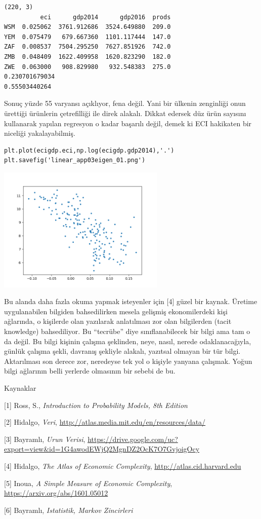 \documentclass[12pt,fleqn]{article}\usepackage{../../common}
\begin{document}
\begin{verbatim}
(220, 3)
          eci      gdp2014      gdp2016  prods
WSM  0.025062  3761.912686  3524.649880  209.0
YEM  0.075479   679.667360  1101.117444  147.0
ZAF  0.008537  7504.295250  7627.851926  742.0
ZMB  0.048409  1622.409958  1620.823290  182.0
ZWE  0.063000   908.829980   932.548383  275.0
0.230701679034
0.55503440264
\end{verbatim}

Sonuç yüzde 55 varyansı açıklıyor, fena değil. Yani bir ülkenin zenginliği
onun ürettiği ürünlerin çetrefilliği ile direk alakalı. Dikkat edersek düz
ürün sayısını kullanarak yapılan regresyon o kadar başarılı değil, demek ki
ECI hakikaten bir niceliği yakalayabilmiş.

\begin{verbatim}
plt.plot(ecigdp.eci,np.log(ecigdp.gdp2014),'.')
plt.savefig('linear_app03eigen_01.png')
\end{verbatim}

\includegraphics[height=6cm]{linear_app03eigen_01.png}

Bu alanda daha fazla okuma yapmak isteyenler için [4] güzel bir
kaynak. Üretime uygulanabilen bilgiden bahsedilirken mesela gelişmiş
ekonomilerdeki kişi ağlarında, o kişilerde olan yazılarak anlatılması zor
olan bilgilerden (tacit knowledge) bahsediliyor. Bu ``tecrübe'' diye
sınıflanabilecek bir bilgi ama tam o da değil. Bu bilgi kişinin çalışma
şeklinden, neye, nasıl, nerede odaklanacağıyla, günlük çalışma şekli,
davranış şekliyle alakalı, yazıtsal olmayan bir tür bilgi. Aktarılması son
derece zor, neredeyse tek yol o kişiyle yanyana çalışmak. Yoğun bilgi
ağlarının belli yerlerde olmasının bir sebebi de bu.

Kaynaklar

[1] Ross, S., {\em Introduction to Probability Models, 8th Edition}

[2] Hidalgo, {\em Veri}, \url{http://atlas.media.mit.edu/en/resources/data/}

[3] Bayramlı, {\em Urun Verisi}, \url{https://drive.google.com/uc?export=view&id=1G4awodEWjQ2MgnDZ2OcK7O7GvjoigOcy}

[4] Hidalgo, {\em The Atlas of Economic Complexity}, \url{http://atlas.cid.harvard.edu}

[5] Inoua, {\em A Simple Measure of Economic Complexity}, \url{https://arxiv.org/abs/1601.05012}

[6] Bayramlı, {\em Istatistik, Markov Zincirleri}
\end{document}
